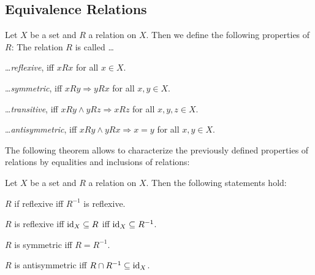 \subsection{Equivalence Relations}

\begin{definition}
    Let $X$ be a set and $R$ a relation on $X$. Then we define the following properties of $R$: The relation $R$ is called \dots
    \begin{definitionenumerate}
        \item \dots \emph{reflexive}, iff $xRx$ for all $x\in X$.
        \item \dots \emph{symmetric}, iff $xRy\Rightarrow yRx$ for all $x,y\in X$.
        \item \dots \emph{transitive}, iff $xRy\land yRz\Rightarrow xRz$ for all $x,y,z\in X$.
        \item \dots \emph{antisymmetric}, iff $xRy\land yRx\Rightarrow x=y$ for all $x,y\in X$.
    \end{definitionenumerate}
\end{definition}

%
%
%

The following theorem allows to characterize the previously defined properties of relations by equalities and inclusions of relations:

\begin{theorem}\label{theorem:relations:properties}
    Let $X$ be a set and $R$ a relation on $X$. Then the following statements hold:
    \begin{intheoremenumerate}
        \item $R$ if reflexive iff $R^{-1}$ is reflexive.
        \item\label{theorem:relations:reflexive} $R$ is reflexive iff $\text{id}_X\subseteq R$ iff $\text{id}_X\subseteq R^{-1}$.
        \item\label{theorem:relations:symmetric} $R$ is symmetric iff $R=R^{-1}$.
        \item\label{theorem:relations:antisymmetric} $R$ is antisymmetric iff $R\cap R^{-1}\subseteq \text{id}_X$.
    \end{intheoremenumerate}
\end{theorem}

